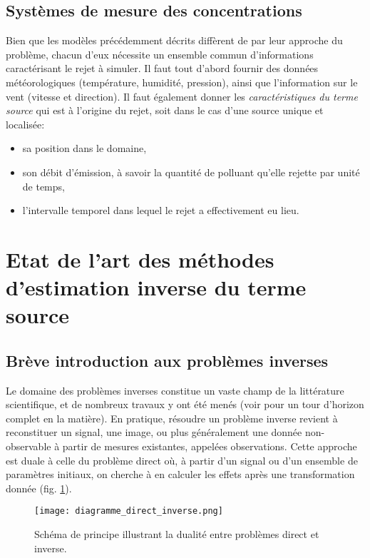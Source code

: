 	\subsection{Systèmes de mesure des concentrations}
	Bien que les modèles précédemment décrits diffèrent de par leur approche du problème, chacun d'eux nécessite un ensemble commun d'informations caractérisant le rejet à simuler. Il faut tout d'abord fournir des données météorologiques (température, humidité, pression), ainsi que l'information sur le vent (vitesse et direction). Il faut également donner les \textit{caractéristiques du terme source} qui est à l'origine du rejet, soit dans le cas d'une source unique et localisée:
	\begin{itemize}
		\item sa position dans le domaine,
		\item son débit d'émission, à savoir la quantité de polluant qu'elle rejette par unité de temps,
		\item l'intervalle temporel dans lequel le rejet a effectivement eu lieu.
	\end{itemize}
	

	
	
		
	\section{Etat de l'art des méthodes d'estimation inverse du terme source}
	\label{section_etat_art_STE}
	
	\subsection{Brève introduction aux problèmes inverses}
	Le domaine des problèmes inverses constitue un vaste champ de la littérature scientifique, et de nombreux travaux y ont été menés (voir \cite{Tarantola2004} pour un tour d'horizon complet en la matière). En pratique, résoudre un problème inverse revient à reconstituer un signal, une image, ou plus généralement une donnée non-observable à partir de mesures existantes, appelées observations. Cette approche est duale à celle du problème direct où, à partir d'un signal ou d'un ensemble de paramètres initiaux, on cherche à en calculer les effets après une transformation donnée (fig. \ref{fig_diagramme_direct_inverse}). \\
	
	\begin{figure}
		\label{fig_diagramme_direct_inverse}
		\centering
		\texttt{[image: diagramme\_direct\_inverse.png]}
		\caption{Schéma de principe illustrant la dualité entre problèmes direct et inverse.}
	\end{figure}
	
